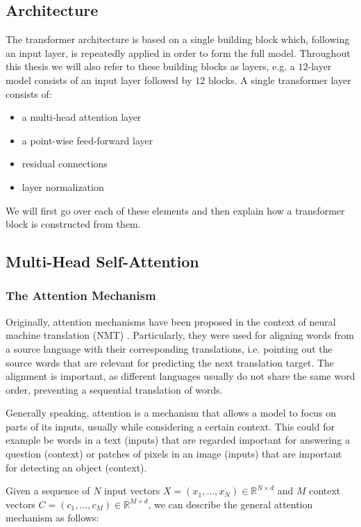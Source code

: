 \subsection{Architecture}
The transformer architecture is based on a single building block which, following an input layer, is repeatedly applied in order to form the full model. Throughout this thesis we will also refer to these building blocks as layers, e.g. a $12$-layer model consists of an input layer followed by $12$ blocks. A single transformer layer consists of:
\begin{itemize}
    \item a multi-head attention layer
    \item a point-wise feed-forward layer
    \item residual connections
    \item layer normalization
\end{itemize}

We will first go over each of these elements and then explain how a transformer block is constructed from them.

\subsection{Multi-Head Self-Attention}

\subsubsection{The Attention Mechanism}
Originally, attention mechanisms have been proposed in the context of neural machine translation (NMT) \cite{bahdanau2014neural,luong2015effective}. Particularly, they were used for aligning words from a source language with their corresponding translations, i.e. pointing out the source words that are relevant for predicting the next translation target. The alignment is important, as different languages usually do not share the same word order, preventing a sequential translation of words.

Generally speaking, attention is a mechanism that allows a model to focus on parts of its inputs, usually while considering a certain context. This could for example be words in a text (inputs) that are regarded important for answering a question (context) or patches of pixels in an image (inputs) that are important for detecting an object (context).

Given a sequence of $N$ input vectors $X = (x_1, \dots, x_N) \in \mathbb{R}^{N \times d}$ and $M$ context vectors $C = (c_1, \dots, c_M) \in \mathbb{R}^{M \times d}$, we can describe the general attention mechanism as follows:

